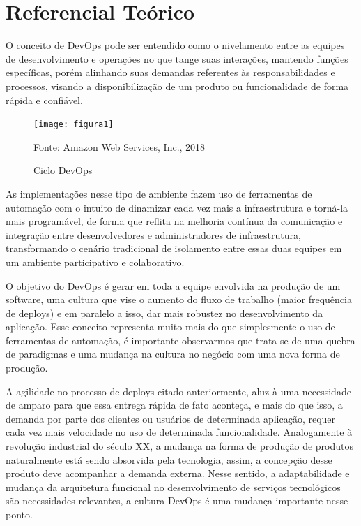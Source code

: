 
\chapter{Referencial Teórico}\label{referencial_teorico}


O conceito de DevOps pode ser entendido como o nivelamento entre as equipes de desenvolvimento e operações no que tange suas interações, mantendo funções específicas, porém alinhando suas demandas referentes às responsabilidades e processos, visando a disponibilização de um produto ou funcionalidade de forma rápida e confiável.\cite{gartnerglossario}

\begin{figure}[htb] %
	\centering
	\texttt{[image: figura1]}
	\caption{Ciclo DevOps}
	Fonte: Amazon Web Services, Inc., 2018
	\label{fig:figura1}
\end{figure}

As implementações nesse tipo de ambiente fazem uso de ferramentas de automação com o intuito de dinamizar cada vez mais a infraestrutura e torná-la mais programável, de forma que reflita na melhoria contínua da comunicação e integração entre desenvolvedores e administradores de infraestrutura, transformando o cenário tradicional de isolamento entre essas duas equipes em um ambiente participativo e colaborativo.\cite{costa}

O objetivo do DevOps é gerar em toda a equipe envolvida na produção de um software, uma cultura que vise o aumento do fluxo de trabalho (maior frequência de deploys) e em paralelo a isso, dar mais robustez no desenvolvimento da aplicação. Esse conceito representa muito mais do que simplesmente o uso de ferramentas de automação, é importante observarmos que trata-se de uma quebra de paradigmas e uma mudança na cultura no negócio com uma nova forma de produção.\cite{sato2014devops}

A agilidade no processo de deploys citado anteriormente, aluz à uma necessidade de amparo para que essa entrega rápida de fato aconteça, e mais do que isso, a demanda por parte dos clientes ou usuários de determinada aplicação, requer cada vez mais velocidade no uso de determinada funcionalidade. Analogamente à revolução industrial do século XX, a mudança na forma de produção de produtos naturalmente está sendo absorvida pela tecnologia, assim, a concepção desse produto deve acompanhar a demanda externa. Nesse sentido, a adaptabilidade e mudança da arquitetura funcional no desenvolvimento de serviços tecnológicos são necessidades relevantes, a cultura DevOps é uma mudança importante nesse ponto.\cite{ibmdevops}

